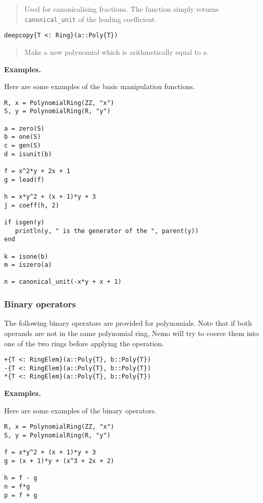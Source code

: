 \documentclass[a4paper,10pt]{article}
\newcommand{\code}{\lstinline}
\newcommand{\desc}[1]{\vspace{-3mm}\begin{quote}#1\end{quote}}
\begin{document}
\desc{Used for canonicalising fractions. The function simply returns
\code{canonical_unit} of the leading coefficient.}

\begin{lstlisting}
deepcopy{T <: Ring}(a::Poly{T})
\end{lstlisting}

\desc{Make a new polynomial which is arithmetically equal to $a$.}

\textbf{Examples.}

Here are some examples of the basic manipulation functions.

\begin{lstlisting}
R, x = PolynomialRing(ZZ, "x")
S, y = PolynomialRing(R, "y")

a = zero(S)
b = one(S)
c = gen(S)
d = isunit(b)

f = x^2*y + 2x + 1
g = lead(f)

h = x*y^2 + (x + 1)*y + 3
j = coeff(h, 2)

if isgen(y)
   println(y, " is the generator of the ", parent(y))
end

k = isone(b)
m = iszero(a)

n = canonical_unit(-x*y + x + 1)
\end{lstlisting}

\subsubsection{Binary operators}

The following binary operators are provided for polynomials. Note that
if both operands are not in the same polynomial ring, Nemo will try to
coerce them into one of the two rings before applying the operation.

\begin{lstlisting}
+{T <: RingElem}(a::Poly{T}, b::Poly{T})
-{T <: RingElem}(a::Poly{T}, b::Poly{T})
*{T <: RingElem}(a::Poly{T}, b::Poly{T})
\end{lstlisting}

\textbf{Examples.}

Here are some examples of the binary operators.

\begin{lstlisting}
R, x = PolynomialRing(ZZ, "x")
S, y = PolynomialRing(R, "y")

f = x*y^2 + (x + 1)*y + 3
g = (x + 1)*y + (x^3 + 2x + 2)

h = f - g
n = f*g
p = f + g
\end{lstlisting}
\end{document}
